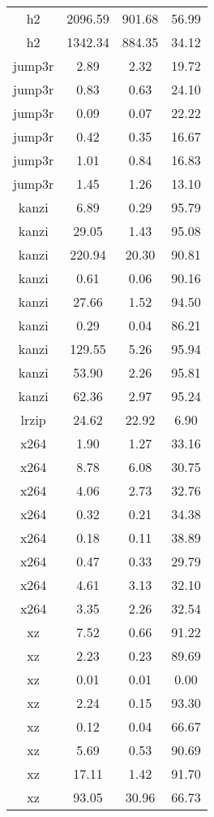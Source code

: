 \begin{table}[h]
\begin{tabular}{|c|c|c|c|}
        h2 & 2096.59 & 901.68 & 56.99 \\
        h2 & 1342.34 & 884.35 & 34.12 \\
        jump3r & 2.89 & 2.32 & 19.72 \\
        jump3r & 0.83 & 0.63 & 24.10 \\
        jump3r & 0.09 & 0.07 & 22.22 \\
        jump3r & 0.42 & 0.35 & 16.67 \\
        jump3r & 1.01 & 0.84 & 16.83 \\
        jump3r & 1.45 & 1.26 & 13.10 \\
        kanzi & 6.89 & 0.29 & 95.79 \\
        kanzi & 29.05 & 1.43 & 95.08 \\
        kanzi & 220.94 & 20.30 & 90.81 \\
        kanzi & 0.61 & 0.06 & 90.16 \\
        kanzi & 27.66 & 1.52 & 94.50 \\
        kanzi & 0.29 & 0.04 & 86.21 \\
        kanzi & 129.55 & 5.26 & 95.94 \\
        kanzi & 53.90 & 2.26 & 95.81 \\
        kanzi & 62.36 & 2.97 & 95.24 \\
        lrzip & 24.62 & 22.92 & 6.90 \\
        x264 & 1.90 & 1.27 & 33.16 \\
        x264 & 8.78 & 6.08 & 30.75 \\
        x264 & 4.06 & 2.73 & 32.76 \\
        x264 & 0.32 & 0.21 & 34.38 \\
        x264 & 0.18 & 0.11 & 38.89 \\
        x264 & 0.47 & 0.33 & 29.79 \\
        x264 & 4.61 & 3.13 & 32.10 \\
        x264 & 3.35 & 2.26 & 32.54 \\
        xz & 7.52 & 0.66 & 91.22 \\
        xz & 2.23 & 0.23 & 89.69 \\
        xz & 0.01 & 0.01 & 0.00 \\
        xz & 2.24 & 0.15 & 93.30 \\
        xz & 0.12 & 0.04 & 66.67 \\
        xz & 5.69 & 0.53 & 90.69 \\
        xz & 17.11 & 1.42 & 91.70 \\
        xz & 93.05 & 30.96 & 66.73 \\

\end{tabular}
\end{table}
